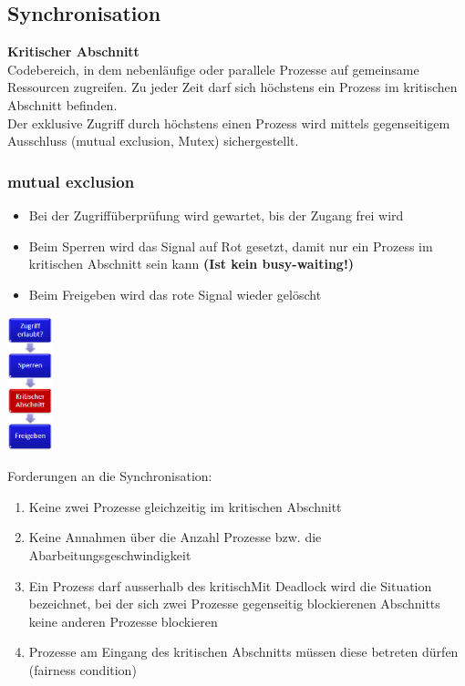 \newpage

\subsection{Synchronisation}
\textbf{Kritischer Abschnitt}\\
Codebereich, in dem nebenläufige oder parallele Prozesse auf gemeinsame Ressourcen zugreifen. Zu jeder 
Zeit darf sich höchstens ein Prozess im kritischen Abschnitt befinden.
\\
Der exklusive Zugriff durch höchstens einen Prozess wird mittels gegenseitigem Ausschluss (mutual 
exclusion, Mutex) sichergestellt.

\subsubsection{mutual exclusion}
\begin{multicols}{2}
  \begin{itemize}
    \item Bei der Zugriffüberprüfung wird gewartet, bis der Zugang frei wird
    \item Beim Sperren wird das Signal auf Rot gesetzt, damit nur ein Prozess im kritischen Abschnitt sein kann \textbf{(Ist kein busy-waiting!)}
    \item Beim Freigeben wird das rote Signal wieder gelöscht
  \end{itemize}
  \vfill\null
  \columnbreak
  \includegraphics[width=0.1\textwidth]{images/Concurrency/Loesungsstruktur.png}
\end{multicols}
Forderungen an die Synchronisation:
\begin{enumerate}
  \item Keine zwei Prozesse gleichzeitig im kritischen Abschnitt
  \item Keine Annahmen über die Anzahl Prozesse bzw. die Abarbeitungsgeschwindigkeit
  \item Ein Prozess darf ausserhalb des kritischMit Deadlock wird die Situation bezeichnet, bei der sich zwei Prozesse gegenseitig blockierenen Abschnitts keine anderen Prozesse blockieren
  \item Prozesse am Eingang des kritischen Abschnitts müssen diese betreten dürfen (fairness condition)
\end{enumerate}

